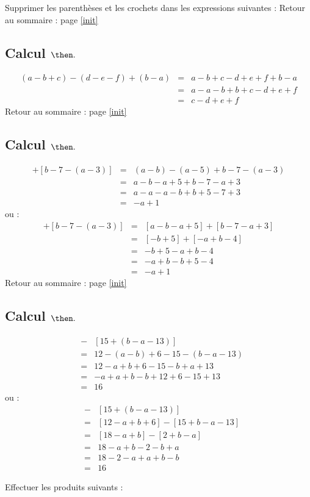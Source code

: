 \documentclass[14pt]{article}
\theoremstyle{remark}
\newcounter{n}
\renewcommand{\it}{Retour au sommaire : page \ref{init}
	\subsection{Calcul $ \mathbf{ \then}.$}\label{\then} \stepcounter{n} }
\theoremstyle{plain}
\begin{document}
Supprimer les parenthèses et les crochets dans les expressions suivantes : 
\it \begin{eqnarray*}(a-b+c) - (d- e - f) + (b-a) &=& 
a - b + c - d + e + f + b - a \\ 
&=& a - a - b + b + c - d + e + f \\
&=& c - d + e + f \end{eqnarray*}
\it \begin{eqnarray*}[(a-b)-(a-5)] + [b-7-(a-3)]&=&
(a-b)-(a-5) + b-7 -(a-3) \\ 
&=& a-b - a + 5 + b - 7 - a +3 \\
&=& a-a-a-b+b+5-7+3 \\
&=& - a +1 \end{eqnarray*}
ou : \begin{eqnarray*}[(a-b)-(a-5)] + [b-7-(a-3)]&=&
[a-b-a+5] + [b-7-a+3] \\
&=& [-b+5] + [-a+b-4] \\
&=& -b+5 -a+b-4 \\
&=& -a + b - b + 5 - 4 \\
&=& -a +1 
 \end{eqnarray*}
\it \begin{eqnarray*} [12-(a-b)+6] &-& [15+ (b-a-13)]\\&=&
12 - (a-b)+6 - 15 - (b-a-13)\\
&=& 12 - a + b + 6 - 15 - b + a + 13 \\
&=& -a + a +b - b +12 + 6 - 15 + 13\\
&=& 16
\end{eqnarray*}
ou :
\begin{eqnarray*} [12-(a-b)+6] &-& [15+ (b-a-13)]\\&=&
[12 - a + b + 6] - [15+b-a-13] \\
&=& [18-a+b]-[2+b-a] \\
&=& 18-a+b - 2 - b +a \\
&=& 18 -2  - a + a  + b - b \\
&=& 16	
\end{eqnarray*}

Effectuer les produits suivants : 
\end{document}
